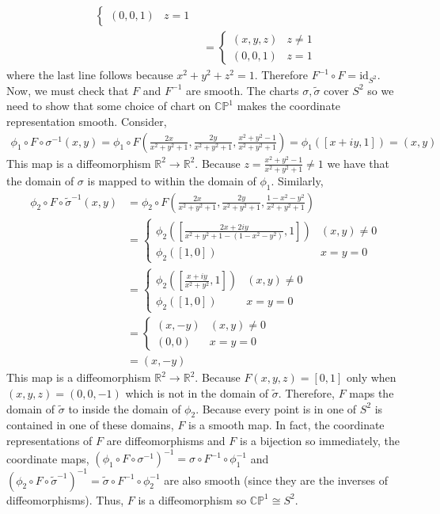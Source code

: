 \documentclass[12pt]{extarticle}
\newcommand{\R}{\mathbb{R}}
\newcommand{\id}{\mathrm{id}}
\newcommand{\CP}{\mathbb{CP}}
\begin{document}
\begin{enumerate}
\begin{align*}
\begin{cases}
(0, 0, 1) & z = 1
\end{cases}
\\
& = 
\begin{cases}
\left( x, y, z \right) & z \neq 1 \\
(0, 0, 1) & z = 1
\end{cases}
\end{align*}
where the last line follows because $x^2 + y^2 + z^2 = 1$. Therefore $F^{-1} \circ F = \id_{S^2}$. Now, we must check that $F$ and $F^{-1}$ are smooth. The charts $\sigma, \tilde{\sigma}$ cover $S^2$ so we need to show that some choice of chart on $\CP^1$ makes the coordinate representation smooth. Consider,
\begin{align*}
\phi_1 \circ F \circ \sigma^{-1}(x, y) = \phi_1 \circ F \left(\frac{2x}{x^2 + y^2 + 1}, \frac{2y}{x^2 + y^2 + 1}, \frac{x^2 + y^2 - 1}{x^2 + y^2 + 1}\right) = \phi_1([x + i y, 1]) = (x, y)
\end{align*} 
This map is a diffeomorphism $\R^2 \to \R^2$. Because $z = \frac{x^2 + y^2 - 1}{x^2 + y^2 + 1} \neq 1$ we have that the domain of $\sigma$ is mapped to within the domain of $\phi_1$. Similarly,
\begin{align*}
\phi_2 \circ F \circ \tilde{\sigma}^{-1}(x, y) & = \phi_2 \circ F \left(\frac{2x}{x^2 + y^2 + 1}, \frac{2y}{x^2 + y^2 + 1}, \frac{1 - x^2 - y^2}{x^2 + y^2 + 1}\right) 
\\
& = 
\begin{cases}
\phi_2 \left(\left[ \frac{2 x + 2 i y}{x^2 + y^2 + 1 - (1 - x^2 - y^2)}, 1 \right] \right) & (x, y) \neq 0 \\
\phi_2([1, 0]) & x = y = 0
\end{cases}
\\
& =
\begin{cases}
\phi_2 \left(\left[ \frac{x + i y}{x^2 + y^2}, 1 \right] \right) & (x, y) \neq 0 \\
\phi_2([1, 0]) & x = y = 0
\end{cases}
\\
& =
\begin{cases}
(x, -y) & (x, y) \neq 0 \\
(0, 0) & x = y = 0
\end{cases}
\\
& = (x, -y)
\end{align*} 
This map is a diffeomorphism $\R^2 \to \R^2$. Because $F(x,y,z) = [0, 1]$ only when $(x,y,z) = (0 ,0, -1)$ which is not in the domain of $\tilde{\sigma}$. Therefore, $F$ maps the domain of $\tilde{\sigma}$ to inside the domain of $\phi_2$. Because every point is in one of $S^2$ is contained in one of these domains, $F$ is a smooth map. In fact, the coordinate representations of $F$ are diffeomorphisms and $F$ is a bijection so immediately, the coordinate maps, $(\phi_1 \circ F \circ \sigma^{-1})^{-1} = \sigma \circ F^{-1} \circ \phi_1^{-1}$ and $(\phi_2 \circ F \circ \tilde{\sigma}^{-1})^{-1} = \tilde{\sigma} \circ F^{-1} \circ \phi_2^{-1}$ are also smooth (since they are the inverses of diffeomorphisms). Thus, $F$ is a diffeomorphism so $\CP^1 \cong S^2$. 
 


\end{enumerate}
\end{document}
